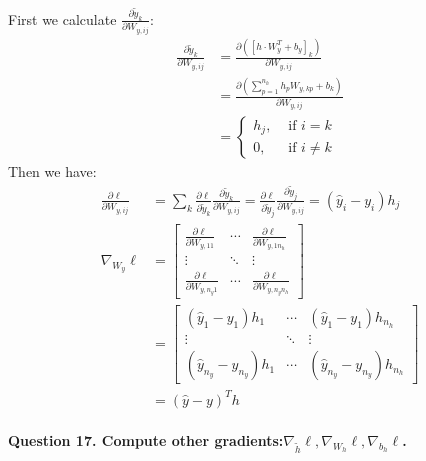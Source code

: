 \documentclass{article}
\begin{document}
First we calculate \(\frac{\partial \tilde{y}_k}{\partial W_{y,ij}}\):
\begin{align*}
    \frac{\partial \tilde{y}_k}{\partial W_{y,ij}}
    &=\frac{\partial ([h\cdot W_y^T +b_y]_k)}{\partial W_{y,ij}}\\
    &=\frac{\partial (\sum_{p=1}^{n_h} h_p W_{y,kp}+b_k)}{\partial W_{y,ij}}\\
    &= \begin{cases}
    h_j, & \text{ if } i = k \\
    0, & \text{ if } i \neq k
    \end{cases}
\end{align*}
Then we have:
\begin{align*}
    \frac{\partial \ell}{\partial W_{y,ij}}
    &= \sum_k \frac{\partial \ell}{\partial \tilde{y}_k} \frac{\partial \tilde{y}_k}{\partial W_{y,ij}}
    = \frac{\partial \ell}{\partial \tilde{y}_j} \frac{\partial \tilde{y}_j}{\partial W_{y,ij}}
    =(\hat{y}_i-y_i)h_j\\
    \nabla_{W_y} \ell
    &=\begin{bmatrix} 
\frac{\partial \ell}{\partial W_{y,11}} & \cdots & \frac{\partial \ell}{\partial W_{y,1n_h}} \\
\vdots & \ddots & \vdots \\
\frac{\partial \ell}{\partial W_{y,n_y 1}} & \cdots & \frac{\partial \ell}{\partial W_{y,n_y n_h}}
\end{bmatrix}\\
&=\begin{bmatrix} 
(\hat{y}_1-y_1)h_1 & \cdots & (\hat{y}_1-y_1)h_{n_h} \\
\vdots & \ddots & \vdots \\
(\hat{y}_{n_y}-y_{n_y})h_1 & \cdots & (\hat{y}_{n_y}-y_{n_y})h_{n_h}
\end{bmatrix}\\
&=(\hat{y}-y)^T h
\end{align*}\\

\noindent \textbf{Question 17. Compute other gradients:\(\nabla_{\tilde{h}} \ell,\nabla_{W_h} \ell, \nabla_{b_h} \ell\).} 
\end{document}
